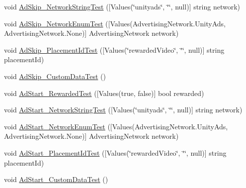 \begin{DoxyCompactItemize}
void \mbox{\hyperlink{class_unity_engine_1_1_analytics_1_1_tests_1_1_analytics_event_tests_a83713b85dd44a3aed1dc5062ed65ec72}{Ad\+Skip\+\_\+\+Network\+String\+Test}} (\mbox{[}Values(\char`\"{}unityads\char`\"{}, \char`\"{}\char`\"{}, null)\mbox{]} string network)
\item 
void \mbox{\hyperlink{class_unity_engine_1_1_analytics_1_1_tests_1_1_analytics_event_tests_a397cd4ddd2eb6ad1a8ec0da158c9d1ab}{Ad\+Skip\+\_\+\+Network\+Enum\+Test}} (\mbox{[}Values(Advertising\+Network.\+Unity\+Ads, Advertising\+Network.\+None)\mbox{]} Advertising\+Network network)
\item 
void \mbox{\hyperlink{class_unity_engine_1_1_analytics_1_1_tests_1_1_analytics_event_tests_a2d580cc1ac242d412e3bbc3ffbfe4881}{Ad\+Skip\+\_\+\+Placement\+Id\+Test}} (\mbox{[}Values(\char`\"{}rewarded\+Video\char`\"{}, \char`\"{}\char`\"{}, null)\mbox{]} string placement\+Id)
\item 
void \mbox{\hyperlink{class_unity_engine_1_1_analytics_1_1_tests_1_1_analytics_event_tests_a9c076ab0771f6e1db223220567700a1a}{Ad\+Skip\+\_\+\+Custom\+Data\+Test}} ()
\item 
void \mbox{\hyperlink{class_unity_engine_1_1_analytics_1_1_tests_1_1_analytics_event_tests_a11ac1b43c1a38cbaed65eae299ec2fee}{Ad\+Start\+\_\+\+Rewarded\+Test}} (\mbox{[}Values(true, false)\mbox{]} bool rewarded)
\item 
void \mbox{\hyperlink{class_unity_engine_1_1_analytics_1_1_tests_1_1_analytics_event_tests_ac65a663772cb2590694aed1a3c8b3f64}{Ad\+Start\+\_\+\+Network\+String\+Test}} (\mbox{[}Values(\char`\"{}unityads\char`\"{}, \char`\"{}\char`\"{}, null)\mbox{]} string network)
\item 
void \mbox{\hyperlink{class_unity_engine_1_1_analytics_1_1_tests_1_1_analytics_event_tests_a01a99d4ab950b569dca0f24d9a66b972}{Ad\+Start\+\_\+\+Network\+Enum\+Test}} (\mbox{[}Values(Advertising\+Network.\+Unity\+Ads, Advertising\+Network.\+None)\mbox{]} Advertising\+Network network)
\item 
void \mbox{\hyperlink{class_unity_engine_1_1_analytics_1_1_tests_1_1_analytics_event_tests_aba4d11a8f1a4be4852784aa1312b011b}{Ad\+Start\+\_\+\+Placement\+Id\+Test}} (\mbox{[}Values(\char`\"{}rewarded\+Video\char`\"{}, \char`\"{}\char`\"{}, null)\mbox{]} string placement\+Id)
\item 
void \mbox{\hyperlink{class_unity_engine_1_1_analytics_1_1_tests_1_1_analytics_event_tests_a349566f996ac393f3ad22536f9d22010}{Ad\+Start\+\_\+\+Custom\+Data\+Test}} ()
\item 

\end{DoxyCompactItemize}
